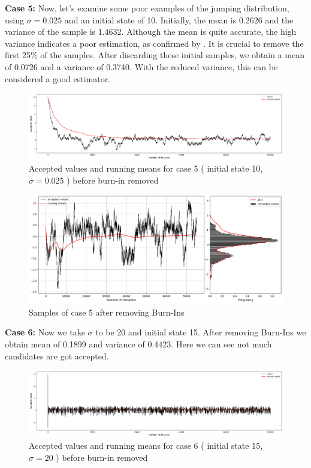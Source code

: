 \begin{example}
    \textbf{Case 5:}  Now, let's examine some poor examples of the jumping distribution, using $\sigma = 0.025$ and an initial state of 10. Initially, the mean is 0.2626 and the variance of the sample is 1.4632. Although the mean is quite accurate, the high variance indicates a poor estimation, as confirmed by . It is crucial to remove the first 25\% of the samples. After discarding these initial samples, we obtain a mean of 0.0726 and a variance of 0.3740. With the reduced variance, this can be considered a good estimator.

    \begin{figure}[H]
        \centering
        \includegraphics[width=1\textwidth]{./images/metropolis/sample-5-values.png}
        \caption{Accepted values and running means for case 5 ( initial state 10, $ \sigma = 0.025 $ ) before burn-in removed}
        \label{fig:MH sample5}
    \end{figure}
    
    \begin{figure}[H]
        \centering
        \includegraphics[width=1\textwidth]{./images/metropolis/sample-5-value-hist-bo.png}
        \caption{Samples of case 5 after removing Burn-Ins}
    \end{figure}

    \textbf{Case 6:} Now we take $ \sigma $ to be 20 and initial state 15. After removing Burn-Ins we obtain mean of 0.1899 and variance of 0.4423. Here we can see not much candidates are got accepted.

    \begin{figure}[H]
        \centering
        \includegraphics[width=1\textwidth]{./images/metropolis/sample-6-values.png}
        \caption{Accepted values and running means for case 6 ( initial state 15, $ \sigma = 20 $ ) before burn-in removed}
    \end{figure}


\end{example}
